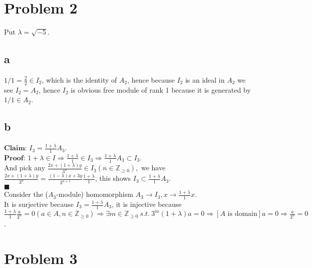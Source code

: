\documentclass{article}
\newcommand{\ST}{\ s.t.\ }
\newcommand{\Proof}{$\textbf{Proof: }$}
\newcommand{\Claim}{$\textbf{Claim: }$}
\newcommand{\ZZ}{\mathbb{Z}}
\newcommand{\mo}[1]{$#1$-module}
\begin{document}
\section{Problem 2}

Put $\lambda=\sqrt{-5}$.

\subsection{a}

$1/1=\frac{2}{2}\in I_2$, which is the identity of $A_2$, hence because $I_2$ is an ideal in $A_2$ we see $I_2=A_2$, hence $I_2$ is obvious free module of rank 1 because it is generated by $1/1\in A_2$.

\subsection{b}

\Claim $I_3=\frac{1+\lambda}{1}A_3$.\\
\Proof $1+\lambda\in I\Rightarrow \frac{1+\lambda}{1}\in I_3\Rightarrow \frac{1+\lambda}{1}A_3\subset I_3$.\\
And pick any $\frac{2x+(1+\lambda)y}{3^n}\in I_3(n\in\ZZ_{\ge 0}),$ we have $\frac{2x+(1+\lambda)y}{3^n}=\frac{(1-\lambda)x+3y}{3^{n+1}}\frac{1+\lambda}{1}$, this shows $I_3\subset \frac{1+\lambda}{1}A_3$.\\
$\blacksquare$\\
Consider the (\mo{A_3}) homomorphism $A_3\rightarrow I_3,x\rightarrow \frac{1+\lambda}{1}x.$\\
It is surjective because $I_3=\frac{1+\lambda}{1}A_3$, it is injective because $\frac{1+\lambda}{1}\frac{a}{3^n}=0(a\in A,n\in\ZZ_{\ge 0})\Rightarrow \exists m\in\ZZ_{\ge 0}\ST 3^m (1+\lambda)a=0\Rightarrow[A\text{ is domain}] a=0\Rightarrow \frac{a}{3^n}=0$.

\section{Problem 3}
\end{document}
